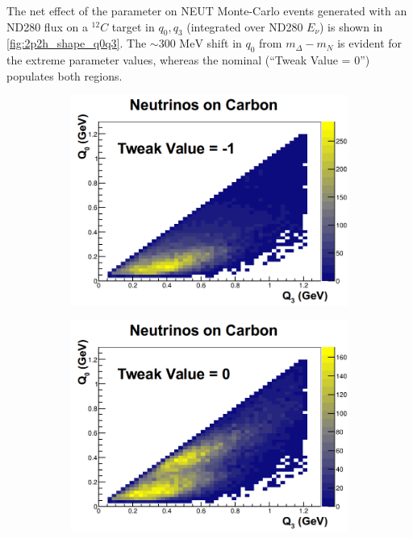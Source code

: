 The net effect of the parameter on NEUT Monte-Carlo events generated with an ND280 flux on a $^{12}C$ target in $q_0, q_3$ (integrated over ND280 $E_\nu$) is shown in \autoref{fig:2p2h_shape_q0q3}. The $\sim300\text{ MeV}$ shift in $q_0$ from $m_\Delta-m_N$ is evident for the extreme parameter values, whereas the nominal (``Tweak Value = 0'') populates both regions.
\begin{figure}[h]
	\centering
	\begin{subfigure}[t]{0.32\textwidth}
		\includegraphics[width=\textwidth, trim={0mm 0mm 0mm 13mm}, clip,page=1]{figures/niwg/neutrino_carbon_m3}
	\end{subfigure}
	\begin{subfigure}[t]{0.32\textwidth}
		\includegraphics[width=\textwidth, trim={0mm 0mm 0mm 13mm}, clip,page=1]{figures/niwg/neutrino_carbon_0}

\end{subfigure}
\end{figure}

